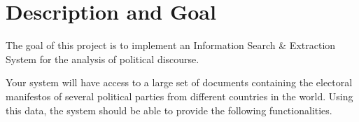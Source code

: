 \documentclass[12pt]{article}
\begin{document}

\section{Description and Goal}
\label{sec:description}

The goal of this project is to implement an Information Search \& Extraction
System for the analysis of political discourse.

Your system will have access to a large set of documents containing the
electoral manifestos of several political parties from different countries in
the world. Using this data, the system should be able to provide the following
functionalities.
\end{document}
